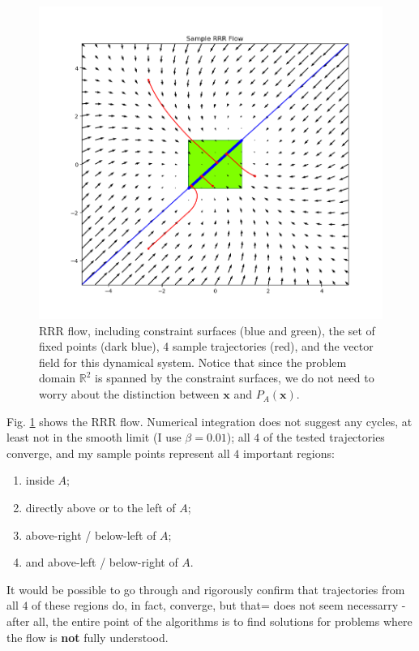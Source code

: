 \documentclass[psamsfonts]{amsart}
\theoremstyle{definition}
\theoremstyle{remark}
\numberwithin{equation}{section}
\begin{document}
\begin{figure}[H]
\centering
\includegraphics[width=\textwidth]{../images/RRR_flow_final.png}
\caption{RRR flow, 
including constraint surfaces (blue and green), 
the set of fixed points (dark blue), 
4 sample trajectories (red), 
and the vector field for this dynamical system. 
Notice that since the problem domain $\mathbb{R}^2$ is spanned by the constraint surfaces, 
we do not need to worry about the distinction between $\mathbf{x}$ and $P_A(\mathbf{x})$.}
\label{fig2}
\end{figure}


Fig. \ref{fig2} shows the RRR flow. 
Numerical integration does not suggest any cycles, at least not in the smooth limit (I use $\beta = 0.01$); 
all $4$ of the tested trajectories converge, and my sample points represent all $4$ important regions:
\begin{enumerate}
\item
inside $A$; 
\item
directly above or to the left of $A$; 
\item
above-right /  below-left of $A$; 
\item
and above-left / below-right of $A$.
\end{enumerate}

It would be possible to go through and rigorously confirm that trajectories from all $4$ of these regions do, in fact, converge, 
but that= does not seem necessarry - after all, the entire point of the algorithms is to find solutions for problems where the 
flow is \textbf{not} fully understood.
\end{document}
